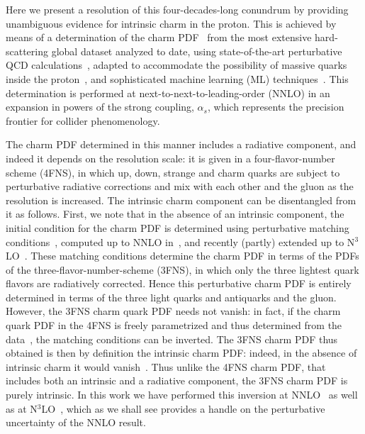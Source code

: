 Here we present a resolution of this four-decades-long conundrum
by providing unambiguous evidence for intrinsic charm  in the proton.
%
This is achieved by means of a determination of the charm
PDF~\cite{Ball:2021leu} from the most extensive hard-scattering 
global dataset analyzed to date, using state-of-the-art perturbative
QCD calculations~\cite{Heinrich:2020ybq}, adapted to accommodate the possibility of massive quarks inside the proton~\cite{Forte:2010ta,Ball:2015dpa,Ball:2015tna}, and sophisticated machine 
learning (ML)
techniques~\cite{Ball:2016neh,Ball:2017nwa,Ball:2021leu}. This
determination is performed at next-to-next-to-leading-order (NNLO) in an
expansion in powers of the strong coupling, $\alpha_s$, which
represents the precision frontier for collider phenomenology.
%

The charm PDF determined in this manner includes a 
radiative component, and
indeed it depends on the resolution scale: it is 
given in a four-flavor-number scheme (4FNS), in which up, 
down, strange and charm quarks are subject to  perturbative
radiative corrections and mix with each other and the gluon as the
resolution is increased.
%
The
intrinsic charm component can be disentangled from it as follows.
%
First, we
note that in the absence of an intrinsic component, the initial
condition for the charm PDF is determined using perturbative matching
conditions~\cite{Collins:1986mp}, computed  up to NNLO in~\cite{pdfnnlo},
and recently (partly) extended up to N$^3$LO~\cite{Bierenbaum:2009zt,Bierenbaum:2009mv,Ablinger:2010ty,Ablinger:2014vwa,Ablinger:2014uka,Behring:2014eya,Ablinger_2014,Ablinger:2014nga,Blumlein:2017wxd}.
%
These matching conditions 
determine the charm PDF in terms of the PDFs of the
three-flavor-number-scheme (3FNS), in which only the three lightest quark 
flavors are radiatively corrected.
%
Hence this perturbative charm PDF is
entirely determined in terms of the three light quarks and antiquarks
and the gluon.
%
However, the 3FNS charm quark PDF needs not
vanish: in fact, if the charm quark PDF in the 4FNS is freely
parametrized and thus determined from the data~\cite{Ball:2015tna},
the matching conditions can be inverted.
%
The 3FNS charm PDF
thus obtained is then by definition the intrinsic charm PDF: indeed, in
the absence of intrinsic charm it would vanish~\cite{Ball:2015dpa}. 
Thus unlike the 4FNS charm PDF, that
includes both an intrinsic and a radiative
component, the 3FNS charm
PDF is purely intrinsic.
%
In this work we have performed this inversion at
NNLO~\cite{pdfnnlo} as well as at N$^3$LO~\cite{Bierenbaum:2009zt,Bierenbaum:2009mv,Ablinger:2010ty,Ablinger:2014vwa,Ablinger:2014uka,Behring:2014eya,Ablinger_2014,Ablinger:2014nga,Blumlein:2017wxd},
which as we shall see provides a handle on the perturbative uncertainty of the NNLO result.

